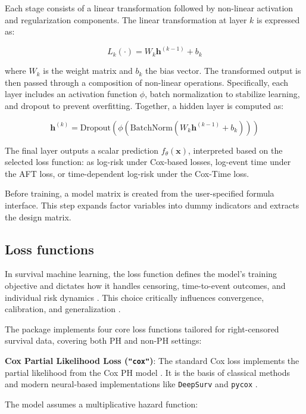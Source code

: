 Each stage consists of a linear transformation followed by non-linear activation and regularization components. The linear transformation at layer \(k\) is expressed as:

\[
L_k(\cdot) = W_k \mathbf{h}^{(k-1)} + b_k
\]

where \(W_k\) is the weight matrix and \(b_k\) the bias vector. The transformed output is then passed through a composition of non-linear operations. Specifically, each layer includes an activation function \(\phi\), batch normalization to stabilize learning, and dropout to prevent overfitting. Together, a hidden layer is computed as:

\[
\mathbf{h}^{(k)} = \text{Dropout} \left( \phi \left( \text{BatchNorm} \left( W_k \mathbf{h}^{(k-1)} + b_k \right) \right) \right)
\]

The final layer outputs a scalar prediction \(f_\theta(\mathbf{x})\), interpreted based on the selected loss function: as log-risk under Cox-based losses, log-event time under the AFT loss, or time-dependent log-risk under the Cox-Time loss.

Before training, a model matrix is created from the user-specified formula interface. This step expands factor variables into dummy indicators and extracts the design matrix.

\subsection{Loss functions}\label{loss-functions}

In survival machine learning, the loss function defines the model's training objective and dictates how it handles censoring, time-to-event outcomes, and individual risk dynamics \citep{wiegrebe2024deep}. This choice critically influences convergence, calibration, and generalization \citep{katzman2018deepsurv}.

The  package implements four core loss functions tailored for right-censored survival data, covering both PH and non-PH settings:

\textbf{Cox Partial Likelihood Loss (\texttt{"cox"})}: The standard Cox loss implements the partial likelihood from the Cox PH model \citep{cox1972regression}. It is the basis of classical methods and modern neural-based implementations like \texttt{DeepSurv} \citep{katzman2018deepsurv} and \texttt{pycox} \citep{kvamme2019time}.

The model assumes a multiplicative hazard function:

